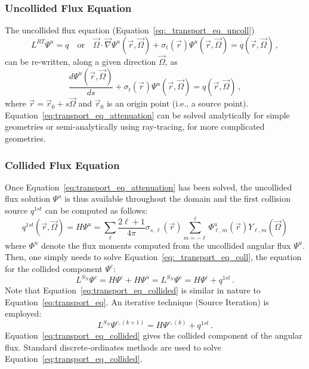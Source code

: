 \documentclass[12pt]{scrartcl}
\newcommand{\grad}{\vec{\nabla}}
\newcommand{\eqt}[1]{Equation~\ref{#1}}                     %
\begin{document}
\subsubsection{Uncollided Flux Equation}
The uncollided flux equation (\eqt{eq:_transport_eq_uncoll})
\[
L^{RT}\Psi^u = q \quad \text{or} \quad 
\vec{\Omega} \cdot \grad \Psi^u(\vec{r},\vec{\Omega}) + \sigma_t(\vec{r}) \Psi^u(\vec{r},\vec{\Omega}) = 
 q(\vec{r},\vec{\Omega}) \,,
\]
can be re-written, along a given direction $\vec{\Omega}$, as
\begin{equation}
\label{eq:transport_eq_attenuation}
\frac{d\Psi^u(\vec{r},\vec{\Omega})}{ds} + \sigma_t(\vec{r}) \Psi^u(\vec{r},\vec{\Omega}) = 
 q(\vec{r},\vec{\Omega}) \,,
\end{equation}
where $\vec{r} = \vec{r}_0+s\vec{\Omega}$ and $\vec{r}_0$ is an origin point (i.e., a source point). 
\eqt{eq:transport_eq_attenuation} can be solved analytically for simple geometries or semi-analytically 
using ray-tracing, for more complicated geometries.

\subsubsection{Collided Flux Equation}

Once \eqt{eq:transport_eq_attenuation} has been solved, the uncollided flux solution $\Psi^u$ 
is thus available throughout the domain and the first collision source $q^{1st}$ can be computed as follows:
\[
q^{1st}(\vec{r},\vec{\Omega}) = H \Psi^u = \sum_\ell \frac{2\ell+1}{4\pi}\sigma_{s,\ell}(\vec{r}) \sum_{m=-\ell}^{\ell} \Phi^u_{\ell,m}(\vec{r})Y_{\ell,m}(\vec{\Omega}) 
\]
where $\Phi^u$ denote the flux moments computed from the uncollided angular flux $\Psi^u$. 
Then, one simply needs to solve \eqt{eq:_transport_eq_coll}, the equation for the collided component $\Psi^c$:
\begin{equation}
\label{eq:transport_eq_collided}
L^{S_N}\Psi^c = H\Psi^c + H\Psi^u = L^{S_N}\Psi^c = H\Psi^c + q^{1st} \,.
\end{equation}
Note that \eqt{eq:transport_eq_collided} is similar in nature to \eqt{eq:transport_eq}. An iterative technique (Source Iteration) is employed:
\[
L^{S_N}\Psi^{c,(k+1)} = H\Psi^{c,(k)} + q^{1st} \,.
\]
\eqt{eq:transport_eq_collided} gives the collided component of the angular flux. Standard discrete-ordinates methods are used to solve \eqt{eq:transport_eq_collided}.
\end{document}
